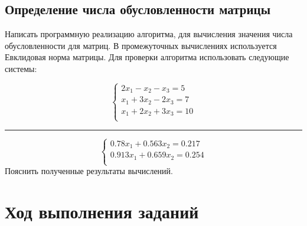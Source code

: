 \documentclass{article}
\begin{document}
\subsection{Определение числа обусловленности матрицы}
Написать программную реализацию алгоритма, для вычисления значения числа
обусловленности для матриц. В промежуточных вычислениях используется Евклидовая
норма матрицы. Для проверки алгоритма использовать следующие системы:

\begin{displaymath}
  \left\{ \begin{array}{ll}
  2x_{1} - x_{2} - x_{3}= 5\\
  x_{1} + 3x_{2} - 2x_{3} = 7\\
  x_{1} + 2x_{2} + 3x_{3} = 10\\
\end{array} \right.
\end{displaymath}
\rule[1mm]{10cm}{0.1mm}
\begin{displaymath}
  \left\{ \begin{array}{ll}
  0.78x_{1} + 0.563x_{2} = 0.217\\
  0.913x_{1} + 0.659x_{2} = 0.254\\
\end{array} \right.
\end{displaymath}
Пояснить полученные результаты вычислений.

\section{Ход выполнения заданий}
\end{document}
